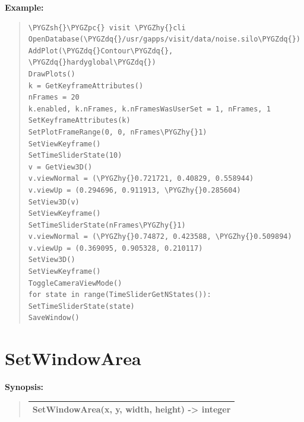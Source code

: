 \documentclass[letterpaper,10pt,english]{sphinxmanual}
\def\PYGZsh{\char`\#}
\def\PYGZpc{\char`\%}
\def\PYGZhy{\char`\-}
\def\PYGZdq{\char`\"}
\begin{document}
\begin{DUlineblock}{0em}
\item[] 
\end{DUlineblock}

\begin{DUlineblock}{0em}
\item[] \textbf{Example:}
\item[] 
\end{DUlineblock}
\begin{quote}

\begin{Verbatim}[commandchars=\\\{\}]
\PYGZsh{}\PYGZpc{} visit \PYGZhy{}cli
OpenDatabase(\PYGZdq{}/usr/gapps/visit/data/noise.silo\PYGZdq{})
AddPlot(\PYGZdq{}Contour\PYGZdq{}, \PYGZdq{}hardyglobal\PYGZdq{})
DrawPlots()
k = GetKeyframeAttributes()
nFrames = 20
k.enabled, k.nFrames, k.nFramesWasUserSet = 1, nFrames, 1
SetKeyframeAttributes(k)
SetPlotFrameRange(0, 0, nFrames\PYGZhy{}1)
SetViewKeyframe()
SetTimeSliderState(10)
v = GetView3D()
v.viewNormal = (\PYGZhy{}0.721721, 0.40829, 0.558944)
v.viewUp = (0.294696, 0.911913, \PYGZhy{}0.285604)
SetView3D(v)
SetViewKeyframe()
SetTimeSliderState(nFrames\PYGZhy{}1)
v.viewNormal = (\PYGZhy{}0.74872, 0.423588, \PYGZhy{}0.509894)
v.viewUp = (0.369095, 0.905328, 0.210117)
SetView3D()
SetViewKeyframe()
ToggleCameraViewMode()
for state in range(TimeSliderGetNStates()):
SetTimeSliderState(state)
SaveWindow()
\end{Verbatim}
\end{quote}


\section{SetWindowArea}
\label{functions:setwindowarea}
\begin{DUlineblock}{0em}
\item[] \textbf{Synopsis:}
\end{DUlineblock}
\begin{quote}

\begin{tabulary}{\linewidth}{|L|}
\hline

SetWindowArea(x, y, width, height) -\textgreater{} integer
\\
\hline\end{tabulary}

\end{quote}
\end{document}
